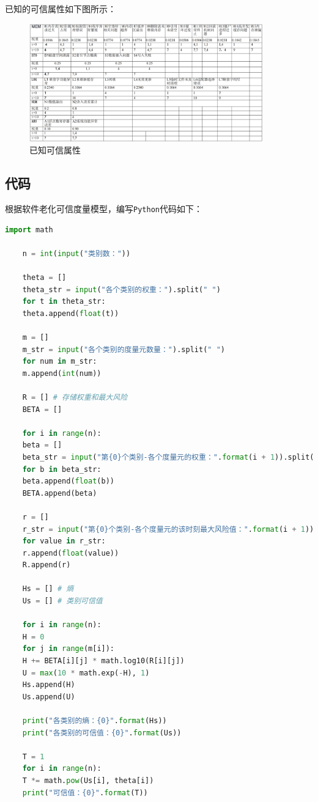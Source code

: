 \documentclass{article}
\begin{document}
已知的可信属性如下图所示：

\begin{figure}[H]
	\centering
	\includegraphics[width=0.9\textwidth]{img/2.png}
	\caption{已知可信属性}
\end{figure}

\subsection{代码}

根据软件老化可信度量模型，编写\texttt{Python}代码如下：

\begin{lstlisting}[language=Python]
	import math
	
	n = int(input("类别数："))
	
	theta = []
	theta_str = input("各个类别的权重：").split(" ")
	for t in theta_str:
	theta.append(float(t))
	
	m = []
	m_str = input("各个类别的度量元数量：").split(" ")
	for num in m_str:
	m.append(int(num))
	
	R = [] # 存储权重和最大风险
	BETA = []
	
	for i in range(n):
	beta = []
	beta_str = input("第{0}个类别-各个度量元的权重：".format(i + 1)).split(" ")
	for b in beta_str:
	beta.append(float(b))
	BETA.append(beta)
	
	r = []
	r_str = input("第{0}个类别-各个度量元的该时刻最大风险值：".format(i + 1)).split(" ")
	for value in r_str:
	r.append(float(value))
	R.append(r)
	
	Hs = [] # 熵
	Us = [] # 类别可信值
	
	for i in range(n):
	H = 0
	for j in range(m[i]):
	H += BETA[i][j] * math.log10(R[i][j])
	U = max(10 * math.exp(-H), 1)
	Hs.append(H)
	Us.append(U)
	
	print("各类别的熵：{0}".format(Hs))
	print("各类别的可信值：{0}".format(Us))
	
	T = 1
	for i in range(n):
	T *= math.pow(Us[i], theta[i])
	print("可信值：{0}".format(T))
	
\end{lstlisting}
\end{document}
